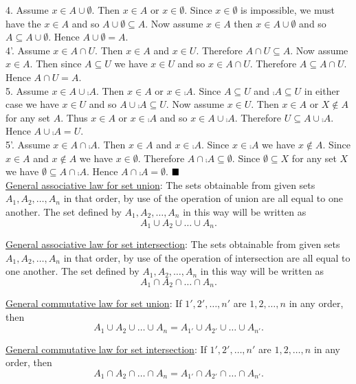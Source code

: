 \documentclass[12pt]{book}
\begin{document}
4. Assume $x \in A \cup \emptyset$. Then $x \in A$ or $x \in \emptyset$. Since $x \in \emptyset$ is impossible, we must have the $x \in A$ and so $A \cup \emptyset \subseteq A$. Now assume $x \in A$ then $x \in A \cup \emptyset$ and so $A \subseteq A \cup \emptyset$. Hence $A \cup \emptyset = A$.\\
4'. Assume $x \in A \cap U$. Then $x \in A$ and $x \in U$. Therefore $A \cap U \subseteq A$. Now assume $x \in A$. Then since $A \subseteq U$ we have $x \in U$ and so $x \in A \cap U$. Therefore $A \subseteq A \cap U$. Hence $A \cap U = A$.\\
5. Assume $x \in A \cup \comp{A}$. Then $x \in A$ or $x \in \comp{A}$. Since $A \subseteq U$ and $\comp{A} \subseteq U$ in either case we have $x \in U$ and so $A \cup \comp{A} \subseteq U$. Now assume $x \in U$. Then $x \in A$ or $X \notin A$ for any set $A$. Thus $x \in A$ or $x \in \comp{A}$ and so $x \in A \cup \comp{A}$. Therefore $U \subseteq A \cup \comp{A}$. Hence $A \cup \comp{A} = U$.\\
5'. Assume $x \in A \cap \comp{A}$. Then $x \in A$ and $x \in \comp{A}$. Since $x \in \comp{A}$ we have $x \notin A$. Since $x \in A$ and $x \notin A$ we have $x \in \emptyset$. Therefore $A \cap \comp{A} \subseteq \emptyset$. Since $\emptyset \subseteq X$ for any set $X$ we have $\emptyset \subseteq A \cap \comp{A}$. Hence $A \cap \comp{A} = \emptyset$. $\qed$\\

\underline{General associative law for set union}: The sets obtainable from given sets $A_1, A_2, \dots, A_n$ in that order, by use of the operation of union are all equal to one another. The set defined by $A_1, A_2, \dots, A_n$ in this way will be written as $$A_1 \cup A_2 \cup \dots \cup A_n.$$

\underline{General associative law for set intersection}: The sets obtainable from given sets $A_1, A_2, \dots, A_n$ in that order, by use of the operation of intersection are all equal to one another. The set defined by $A_1, A_2, \dots, A_n$ in this way will be written as $$A_1 \cap A_2 \cap \dots \cap A_n.$$

\underline{General commutative law for set union}: If $1',2',\dots,n'$ are $1,2,\dots,n$ in any order, then $$A_1 \cup A_2 \cup \dots \cup A_n = A_{1'} \cup A_{2'} \cup \dots \cup A_{n'}.$$

\underline{General commutative law for set intersection}: If $1',2',\dots,n'$ are $1,2,\dots,n$ in any order, then $$A_1 \cap A_2 \cap \dots \cap A_n = A_{1'} \cap A_{2'} \cap \dots \cap A_{n'}.$$
\end{document}
